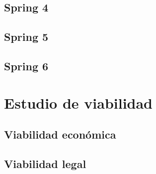 \subsection{Spring 4}

\subsection{Spring 5}

\subsection{Spring 6}


\section{Estudio de viabilidad}

\subsection{Viabilidad económica}

\subsection{Viabilidad legal}


